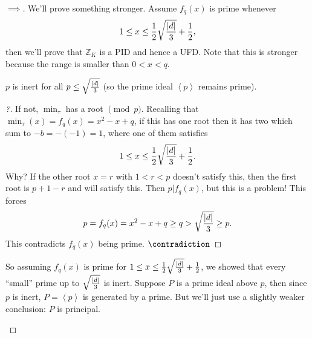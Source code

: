 \begin{proof}[$\implies$]

We'll prove something stronger. Assume \(f_q(x)\) is prime whenever
\begin{align*}
1 \leq x \leq {1\over 2} \sqrt{ {\left\lvert {d} \right\rvert} \over 3 } + {1 \over 2}
,\end{align*}
then we'll prove that \({\mathbb{Z}}_K\) is a PID and hence a UFD. Note
that this is stronger because the range is smaller than \(0<x<q\).

\begin{claim}

\(p\) is inert for all
\(p \leq \sqrt{ {\left\lvert {d} \right\rvert}\over 3 }\) (so the prime
ideal \(\left\langle{ p }\right\rangle\) remains prime).

\end{claim}

\begin{proof}[?]

If not, \(\min_\tau\) has a root \(\pmod p\). Recalling that
\(\min_\tau(x) = f_q(x) = x^2 - x + q\), if this has one root then it
has two which sum to \(-b = -(-1) = 1\), where one of them satisfies
\begin{align*}
1 \leq x \leq {1\over 2} \sqrt{ {\left\lvert {d} \right\rvert} \over 3 } + {1\over 2}
.\end{align*}
Why? If the other root \(x = r\) with \(1<r<p\) doesn't satisfy this,
then the first root is \(p+1-r\) and will satisfy this. Then
\(p\mathrel{\Big|}f_q(x)\), but this is a problem! This forces
\begin{align*}
p = f_q(x) = x^2 - x + q \geq q > \sqrt{{\left\lvert {d} \right\rvert} \over 3 } \geq p
.\end{align*}
This contradicts \(f_q(x)\) being prime. \(\contradiction\)

\end{proof}

So assuming \(f_q(x)\) is prime for
\(1 \leq x \leq {1 \over 2 } \sqrt{{\left\lvert {d} \right\rvert}\over 3 } + {1 \over 2}\),
we showed that every ``small'' prime up to
\(\sqrt{{\left\lvert {d} \right\rvert}\over 3 }\) is inert. Suppose
\(P\) is a prime ideal above \(p\), then since \(p\) is inert,
\(P = \left\langle{ p }\right\rangle\) is generated by a prime. But
we'll just use a slightly weaker conclusion: \(P\) is principal.

\begin{theorem}


\end{theorem}
\end{proof}
